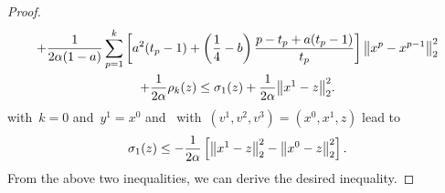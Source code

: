 \documentclass[../main]{subfiles}
\begin{document}
\begin{proof}
\begin{multline}
        + \frac{1}{2 \alpha (1 - a)} \sum_{p = 1}^{k} \left[ a^2 (t_p - 1) + \left( \frac{1}{4} - b \right) \frac{p - t_p + a(t_p - 1)}{t_p} \right] \norm*{x^p - x^{p - 1}}_2^2 \\
        + \frac{1}{2 \alpha} \rho_k(z)
        \le \sigma_1(z) + \frac{1}{2 \alpha} \norm*{x^1 - z}_2^2
        .\end{multline}
     with~$k = 0$ and~$y^1 = x^0$ and~ with~$(v^1, v^2, v^3) = (x^0, x^1, z)$ lead to
    \begin{equation}
        \sigma_1(z) \le - \frac{1}{2 \alpha} \left[ \norm*{x^1 - z}_2^2 - \norm*{x^0 - z}_2^2 \right]
        .\end{equation}
    From the above two inequalities, we can derive the desired inequality.
\end{proof}
\end{document}
